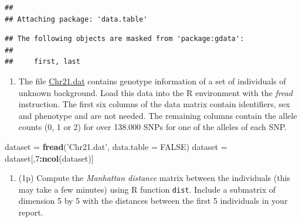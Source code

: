 \documentclass[
]{article}
\newenvironment{Shaded}{\begin{snugshade}}{\end{snugshade}}
\newcommand{\DataTypeTok}[1]{\textcolor[rgb]{0.13,0.29,0.53}{#1}}
\newcommand{\DecValTok}[1]{\textcolor[rgb]{0.00,0.00,0.81}{#1}}
\newcommand{\KeywordTok}[1]{\textcolor[rgb]{0.13,0.29,0.53}{\textbf{#1}}}
\newcommand{\NormalTok}[1]{#1}
\newcommand{\OperatorTok}[1]{\textcolor[rgb]{0.81,0.36,0.00}{\textbf{#1}}}
\newcommand{\OtherTok}[1]{\textcolor[rgb]{0.56,0.35,0.01}{#1}}
\newcommand{\StringTok}[1]{\textcolor[rgb]{0.31,0.60,0.02}{#1}}
\providecommand{\tightlist}{%
  \setlength{\itemsep}{0pt}\setlength{\parskip}{0pt}}
\begin{document}
\begin{verbatim}
## 
## Attaching package: 'data.table'
\end{verbatim}

\begin{verbatim}
## The following objects are masked from 'package:gdata':
## 
##     first, last
\end{verbatim}

\begin{enumerate}
\def\labelenumi{\arabic{enumi}.}
\tightlist
\item
  The file
  \href{http://www-eio.upc.es/~jan/data/bsg/Chr21.dat}{Chr21.dat}
  contains genotype information of a set of individuals of unknown
  background. Load this data into the R environment with the
  \emph{fread} instruction. The first six columns of the data matrix
  contain identifiers, sex and phenotype and are not needed. The
  remaining columns contain the allele counts (0, 1 or 2) for over
  138.000 SNPs for one of the alleles of each SNP.
\end{enumerate}

\begin{Shaded}
\begin{Highlighting}[]
\NormalTok{dataset =}\StringTok{ }\KeywordTok{fread}\NormalTok{(}\StringTok{'Chr21.dat'}\NormalTok{, }\DataTypeTok{data.table =} \OtherTok{FALSE}\NormalTok{)}
\NormalTok{dataset =}\StringTok{ }\NormalTok{dataset[,}\DecValTok{7}\OperatorTok{:}\KeywordTok{ncol}\NormalTok{(dataset)]}
\end{Highlighting}
\end{Shaded}

\begin{enumerate}
\def\labelenumi{\arabic{enumi}.}
\setcounter{enumi}{1}
\tightlist
\item
  (1p) Compute the \emph{Manhattan distance} matrix between the
  individuals (this may take a few minutes) using R function
  \texttt{dist}. Include a submatrix of dimension 5 by 5 with the
  distances between the first 5 individuals in your report.
\end{enumerate}
\end{document}
